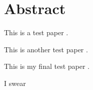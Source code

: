 \documentclass{article}
\begin{document}
\section*{} 

\section*{} 
\section*{} 

\section*{Abstract}

This is a test paper \cite{armstrong_preston_2017}.

This is another test paper \cite{briggs_beck_2007}.

This is my final test paper \cite{cerreto_nielsen_harrod_nielsen_2016}.

I swear \cite{magadagela_nel_marnewick_2017}

\printbibliography
 
\end{document}
